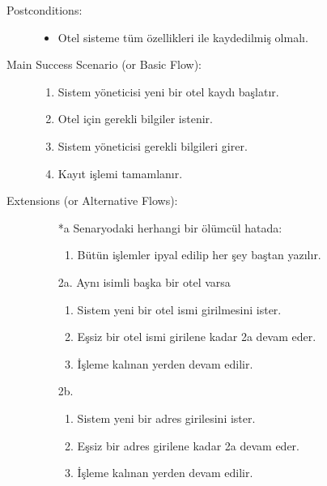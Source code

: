 \documentclass[12pt,a4paper]{report}
\begin{document}
\begin{description}
\item[Postconditions:] \hspace{10mm}
\begin{itemize}
\item Otel sisteme tüm özellikleri ile kaydedilmiş olmalı.
\end{itemize}
\item[Main Success Scenario (or Basic Flow):] \hspace{10mm}
\begin{enumerate}
\item Sistem yöneticisi yeni bir otel kaydı başlatır.
\item Otel için gerekli bilgiler istenir.
\item Sistem yöneticisi gerekli bilgileri girer.
\item Kayıt işlemi tamamlanır.
\end{enumerate}
\item[Extensions (or Alternative Flows):] \hspace{10mm}
\begin{itemize}
\item[*a] Senaryodaki herhangi bir ölümcül hatada:
    \begin{enumerate}
    \item Bütün işlemler ipyal edilip her şey baştan yazılır.
    \end{enumerate}
\item[2a.] Aynı isimli başka bir otel varsa
    \begin{enumerate}
    \item Sistem yeni bir otel ismi girilmesini ister.
    \item Eşsiz bir otel ismi girilene kadar 2a devam eder.
    \item İşleme kalınan yerden devam edilir.
    \end{enumerate}
\item[2b.]
    \begin{enumerate}
    \item Sistem yeni bir adres girilesini ister.
    \item Eşsiz bir adres girilene kadar 2a devam eder.
    \item İşleme kalınan yerden devam edilir.
    \end{enumerate}
\end{itemize}
\end{description}
\end{document}
